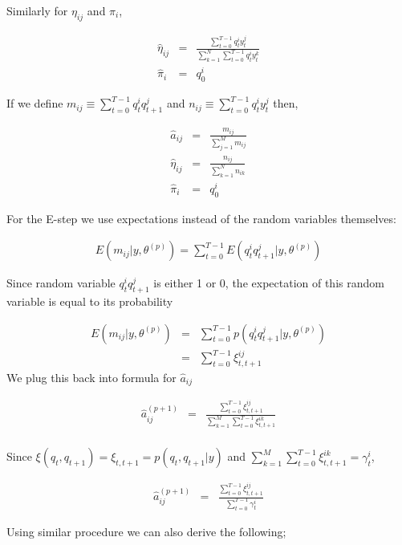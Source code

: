 Similarly for $\eta_{ij}$ and $\pi_i$,

\begin{eqnarray*}
\hat{\eta}_{ij} &=& \frac{\sum_{t=0}^{T-1} q_t^i y_t^j}{\sum_{k=1}^N
\sum_{t=0}^{T-1} q_t^i y_t^k} \\
\hat{\pi}_i &=& q_0^i
\end{eqnarray*}

If we define $m_{ij} \equiv \sum_{t=0}^{T-1} q_t^i q_{t+1}^j$ and $n_{ij}
\equiv \sum_{t=0}^{T-1} q_t^i y_t^j$ then,

\begin{eqnarray*}
\hat{a}_{ij}  &=& \frac{m_{ij}}{\sum_{j=1}^M m_{ij}}  \\
\hat{\eta}_{ij} &=& \frac{n_{ij}}{\sum_{k=1}^Nn_{ik}}\\
\hat{\pi}_i &=& q_0^i
\end{eqnarray*}

For the E-step we use expectations instead of the random variables themselves:

\begin{eqnarray*}
E(m_{ij}|y,\theta^{(p)}) = \sum_{t=0}^{T-1}E(q_t^i q_{t+1}^j|y,\theta^{(p)})
\end{eqnarray*}

Since random variable $q_t^i q_{t+1}^j$ is either 1 or 0, the expectation of
this random variable is equal to its probability

\begin{eqnarray*}
E(m_{ij}|y,\theta^{(p)}) &=& \sum_{t=0}^{T-1}p(q_t^i q_{t+1}^j|y,\theta^{(p)})\\
&=& \sum_{t=0}^{T-1} \xi_{t,t+1}^{ij}
\end{eqnarray*}
We plug this back into formula for $\hat{a}_{ij}$

\begin{eqnarray*}
\hat{a}_{ij}^{(p+1)}  &=& \frac{\sum_{t=0}^{T-1} \xi_{t,t+1}^{ij}}
    {\sum_{k=1}^M \sum_{t=0}^{T-1} \xi_{t,t+1}^{ik}}  \\
\end{eqnarray*}

Since $\xi(q_t,q_{t+1})=\xi_{t,t+1}=p(q_t,q_{t+1}|y)$ and $\sum_{k=1}^M \sum_{t=0}^{T-1}
\xi_{t,t+1}^{ik} = \gamma_t^i$,

\begin{eqnarray*}
\hat{a}_{ij}^{(p+1)}  &=& \frac{\sum_{t=0}^{T-1} \xi_{t,t+1}^{ij}}{\sum_{t=0}^{T-1} \gamma_t^i} 
\end{eqnarray*}

Using similar procedure we can also derive the following;

